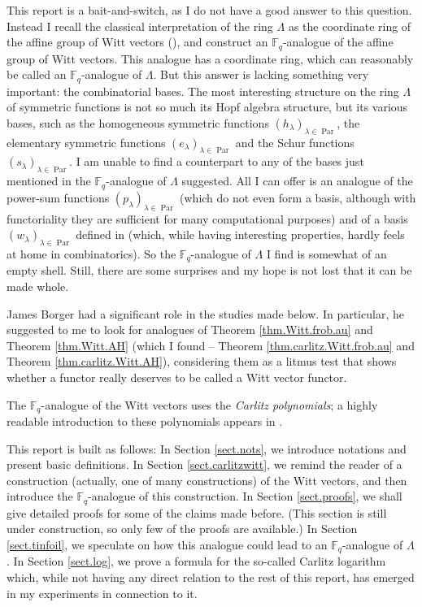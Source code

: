 \documentclass[numbers=enddot,12pt,final,onecolumn,notitlepage]{scrartcl}%
\theoremstyle{definition}
\begin{document}
This report is a bait-and-switch, as I do not have a good answer to this
question. Instead I recall the classical interpretation of the ring $\Lambda$
as the coordinate ring of the affine group of Witt vectors (\cite[\S 9--\S 10]%
{hw-witt1}), and construct an $\mathbb{F}_{q}$-analogue of the affine group of
Witt vectors. This analogue has a coordinate ring, which can reasonably be
called an $\mathbb{F}_{q}$-analogue of $\Lambda$. But this answer is lacking
something very important: the combinatorial bases. The most interesting
structure on the ring $\Lambda$ of symmetric functions is not so much its Hopf
algebra structure, but its various bases, such as the homogeneous symmetric
functions $\left(  h_{\lambda}\right)  _{\lambda\in\operatorname*{Par}}$, the
elementary symmetric functions $\left(  e_{\lambda}\right)  _{\lambda
\in\operatorname*{Par}}$ and the Schur functions $\left(  s_{\lambda}\right)
_{\lambda\in\operatorname*{Par}}$. I am unable to find a counterpart to any of
the bases just mentioned in the $\mathbb{F}_{q}$-analogue of $\Lambda$
suggested. All I can offer is an analogue of the power-sum functions $\left(
p_{\lambda}\right)  _{\lambda\in\operatorname*{Par}}$ (which do not even form
a basis, although with functoriality they are sufficient for many
computational purposes) and of a basis $\left(  w_{\lambda}\right)
_{\lambda\in\operatorname*{Par}}$ defined in \cite[Exercise 2.80
(c)]{reiner-hopf} (which, while having interesting properties, hardly feels at
home in combinatorics). So the $\mathbb{F}_{q}$-analogue of $\Lambda$ I find
is somewhat of an empty shell. Still, there are some surprises and my hope is
not lost that it can be made whole.

James Borger had a significant role in the studies made below. In particular,
he suggested to me to look for analogues of Theorem \ref{thm.Witt.frob.au} and
Theorem \ref{thm.Witt.AH} (which I found -- Theorem
\ref{thm.carlitz.Witt.frob.au} and Theorem \ref{thm.carlitz.Witt.AH}),
considering them as a litmus test that shows whether a functor really deserves
to be called a Witt vector functor.

The $\mathbb{F}_{q}$-analogue of the Witt vectors uses the \textit{Carlitz
polynomials}; a highly readable introduction to these polynomials appears in
\cite{kc-carlitz}.

This report is built as follows: In Section \ref{sect.nots}, we introduce
notations and present basic definitions. In Section \ref{sect.carlitzwitt}, we
remind the reader of a construction (actually, one of many constructions) of
the Witt vectors, and then introduce the $\mathbb{F}_{q}$-analogue of this
construction. In Section \ref{sect.proofs}, we shall give detailed proofs for
some of the claims made before. (This section is still under construction, so
only few of the proofs are available.) In Section \ref{sect.tinfoil}, we
speculate on how this analogue could lead to an $\mathbb{F}_{q}$-analogue of
$\Lambda$. In Section \ref{sect.log}, we prove a formula for the so-called
Carlitz logarithm which, while not having any direct relation to the rest of
this report, has emerged in my experiments in connection to it.
\end{document}
